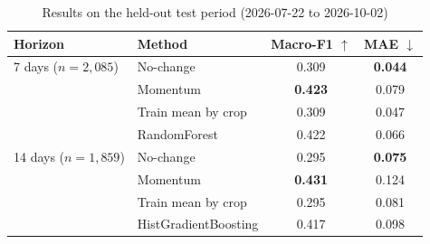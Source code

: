 \begin{table}[t]
\caption{Results on the held-out test period (2026-07-22 to 2026-10-02)}
\label{tab:comparison}
\centering
\footnotesize
\begin{tabular}{@{}llcc@{}}
\toprule
Horizon & Method & Macro-F1 $\uparrow$ & MAE $\downarrow$ \\
\midrule
7 days ($n=2{,}085$) & No-change & 0.309 & \textbf{0.044} \\
 & Momentum & \textbf{0.423} & 0.079 \\
 & Train mean by crop & 0.309 & 0.047 \\
 & RandomForest & 0.422 & 0.066 \\
\midrule
14 days ($n=1{,}859$) & No-change & 0.295 & \textbf{0.075} \\
 & Momentum & \textbf{0.431} & 0.124 \\
 & Train mean by crop & 0.295 & 0.081 \\
 & HistGradientBoosting & 0.417 & 0.098 \\
\bottomrule
\end{tabular}
\end{table}
